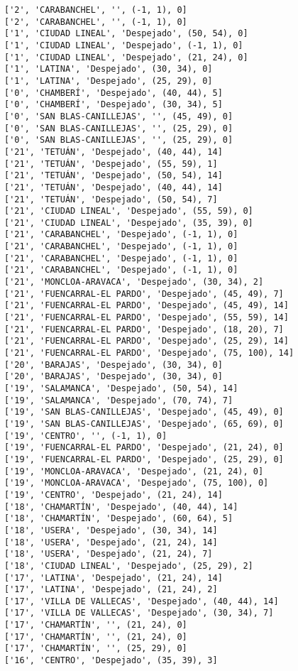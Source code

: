 \documentclass[11pt]{article}
\begin{document}
\begin{Verbatim}[commandchars=\\\{\}]
['2', 'CARABANCHEL', '', (-1, 1), 0]
['2', 'CARABANCHEL', '', (-1, 1), 0]
['1', 'CIUDAD LINEAL', 'Despejado', (50, 54), 0]
['1', 'CIUDAD LINEAL', 'Despejado', (-1, 1), 0]
['1', 'CIUDAD LINEAL', 'Despejado', (21, 24), 0]
['1', 'LATINA', 'Despejado', (30, 34), 0]
['1', 'LATINA', 'Despejado', (25, 29), 0]
['0', 'CHAMBERÍ', 'Despejado', (40, 44), 5]
['0', 'CHAMBERÍ', 'Despejado', (30, 34), 5]
['0', 'SAN BLAS-CANILLEJAS', '', (45, 49), 0]
['0', 'SAN BLAS-CANILLEJAS', '', (25, 29), 0]
['0', 'SAN BLAS-CANILLEJAS', '', (25, 29), 0]
['21', 'TETUÁN', 'Despejado', (40, 44), 14]
['21', 'TETUÁN', 'Despejado', (55, 59), 1]
['21', 'TETUÁN', 'Despejado', (50, 54), 14]
['21', 'TETUÁN', 'Despejado', (40, 44), 14]
['21', 'TETUÁN', 'Despejado', (50, 54), 7]
['21', 'CIUDAD LINEAL', 'Despejado', (55, 59), 0]
['21', 'CIUDAD LINEAL', 'Despejado', (35, 39), 0]
['21', 'CARABANCHEL', 'Despejado', (-1, 1), 0]
['21', 'CARABANCHEL', 'Despejado', (-1, 1), 0]
['21', 'CARABANCHEL', 'Despejado', (-1, 1), 0]
['21', 'CARABANCHEL', 'Despejado', (-1, 1), 0]
['21', 'MONCLOA-ARAVACA', 'Despejado', (30, 34), 2]
['21', 'FUENCARRAL-EL PARDO', 'Despejado', (45, 49), 7]
['21', 'FUENCARRAL-EL PARDO', 'Despejado', (45, 49), 14]
['21', 'FUENCARRAL-EL PARDO', 'Despejado', (55, 59), 14]
['21', 'FUENCARRAL-EL PARDO', 'Despejado', (18, 20), 7]
['21', 'FUENCARRAL-EL PARDO', 'Despejado', (25, 29), 14]
['21', 'FUENCARRAL-EL PARDO', 'Despejado', (75, 100), 14]
['20', 'BARAJAS', 'Despejado', (30, 34), 0]
['20', 'BARAJAS', 'Despejado', (30, 34), 0]
['19', 'SALAMANCA', 'Despejado', (50, 54), 14]
['19', 'SALAMANCA', 'Despejado', (70, 74), 7]
['19', 'SAN BLAS-CANILLEJAS', 'Despejado', (45, 49), 0]
['19', 'SAN BLAS-CANILLEJAS', 'Despejado', (65, 69), 0]
['19', 'CENTRO', '', (-1, 1), 0]
['19', 'FUENCARRAL-EL PARDO', 'Despejado', (21, 24), 0]
['19', 'FUENCARRAL-EL PARDO', 'Despejado', (25, 29), 0]
['19', 'MONCLOA-ARAVACA', 'Despejado', (21, 24), 0]
['19', 'MONCLOA-ARAVACA', 'Despejado', (75, 100), 0]
['19', 'CENTRO', 'Despejado', (21, 24), 14]
['18', 'CHAMARTÍN', 'Despejado', (40, 44), 14]
['18', 'CHAMARTÍN', 'Despejado', (60, 64), 5]
['18', 'USERA', 'Despejado', (30, 34), 14]
['18', 'USERA', 'Despejado', (21, 24), 14]
['18', 'USERA', 'Despejado', (21, 24), 7]
['18', 'CIUDAD LINEAL', 'Despejado', (25, 29), 2]
['17', 'LATINA', 'Despejado', (21, 24), 14]
['17', 'LATINA', 'Despejado', (21, 24), 2]
['17', 'VILLA DE VALLECAS', 'Despejado', (40, 44), 14]
['17', 'VILLA DE VALLECAS', 'Despejado', (30, 34), 7]
['17', 'CHAMARTÍN', '', (21, 24), 0]
['17', 'CHAMARTÍN', '', (21, 24), 0]
['17', 'CHAMARTÍN', '', (25, 29), 0]
['16', 'CENTRO', 'Despejado', (35, 39), 3]

\end{Verbatim}
\end{document}
